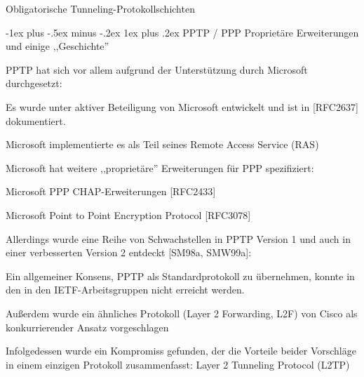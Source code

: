 \documentclass[a4paper]{article}
\makeatletter
\renewcommand{\subsubsection}{\@startsection{subsubsection}{3}{0mm}%
 {-1ex plus -.5ex minus -.2ex}%
 {1ex plus .2ex}%
 {\normalfont\small\bfseries}}
\makeatother
\begin{document}
\begin{multicols}{3}
      Obligatorische Tunneling-Protokollschichten



      \subsubsection{PPTP / PPP Proprietäre Erweiterungen und einige
            ,,Geschichte''}

      \begin{itemize*}
            \item PPTP hat sich vor allem aufgrund der Unterstützung durch Microsoft
            durchgesetzt:
            \begin{itemize*}
                  \item Es wurde unter aktiver Beteiligung von Microsoft entwickelt und ist in {[}RFC2637{]} dokumentiert.
                  \item Microsoft implementierte es als Teil seines Remote Access Service (RAS)
            \end{itemize*}
            \item Microsoft hat weitere ,,proprietäre'' Erweiterungen für PPP
            spezifiziert:
            \begin{itemize*}
                  \item Microsoft PPP CHAP-Erweiterungen {[}RFC2433{]}
                  \item Microsoft Point to Point Encryption Protocol {[}RFC3078{]}
            \end{itemize*}
            \item Allerdings wurde eine Reihe von Schwachstellen in PPTP Version 1 und
            auch in einer verbesserten Version 2 entdeckt {[}SM98a, SMW99a{]}:
            \begin{itemize*}
                  \item Ein allgemeiner Konsens, PPTP als Standardprotokoll zu übernehmen, konnte in den in den IETF-Arbeitsgruppen nicht erreicht werden.
                  \item Außerdem wurde ein ähnliches Protokoll (Layer 2 Forwarding, L2F) von Cisco als konkurrierender Ansatz vorgeschlagen
                  \item Infolgedessen wurde ein Kompromiss gefunden, der die Vorteile beider Vorschläge in einem einzigen Protokoll zusammenfasst: Layer 2 Tunneling Protocol (L2TP)
            \end{itemize*}
      \end{itemize*}



\end{multicols}
\end{document}
